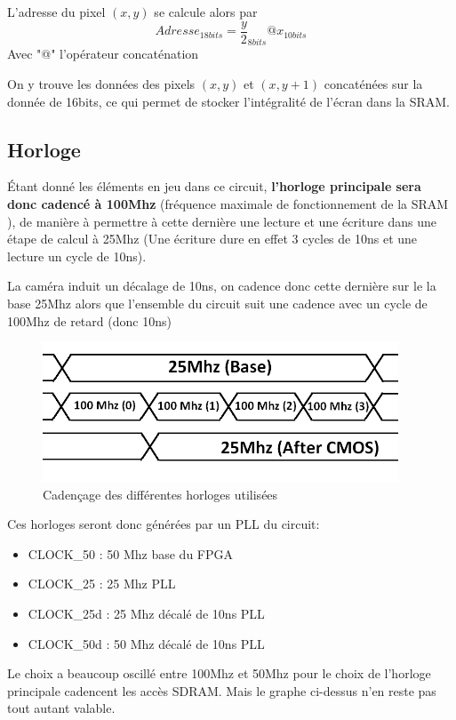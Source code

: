 \documentclass[10pt,a4paper]{report}
\begin{document}
\begin{enumerate}
\begin{itemize}
L'adresse du pixel $\left(x,y\right)$ se calcule alors par
\[ Adresse_{18bits} = \frac{y}{2}_{8bits} @ x_{10bits} \]
Avec "@" l'opérateur concaténation

On y trouve les données des pixels $\left(x,y\right)$ et $\left(x,y+1\right)$ concaténées sur la donnée de 16bits, ce qui permet de stocker l'intégralité de l'écran dans la SRAM.
\end{itemize}
\end{enumerate}

\subsection{Horloge}
Étant donné les éléments en jeu dans ce circuit, \textbf{l'horloge principale sera donc cadencé à 100Mhz} (fréquence maximale de fonctionnement de la SRAM ), de manière à permettre à cette dernière une lecture et une écriture dans une étape de calcul à 25Mhz (Une écriture dure en effet 3 cycles de 10ns et une lecture un cycle de 10ns).

La caméra induit un décalage de 10ns, on cadence donc cette dernière sur le la base 25Mhz alors que l'ensemble du circuit suit une cadence avec un cycle de 100Mhz de retard (donc 10ns)
\begin{figure}[!h]
\centering
\includegraphics[width=300pt]{gfx/clock.png}
\caption{Cadençage des différentes horloges utilisées}
\end{figure}

Ces horloges seront donc générées par un PLL du circuit:

\begin{itemize}
\item CLOCK\_50 : 50 Mhz base du FPGA
\item CLOCK\_25 : 25 Mhz PLL
\item CLOCK\_25d : 25 Mhz décalé de 10ns PLL 
\item CLOCK\_50d : 50 Mhz décalé de 10ns PLL
\end{itemize}

Le choix a beaucoup oscillé entre 100Mhz et 50Mhz pour le choix de l'horloge principale cadencent les accès SDRAM. Mais le graphe ci-dessus n'en reste pas tout autant valable.
\end{document}
